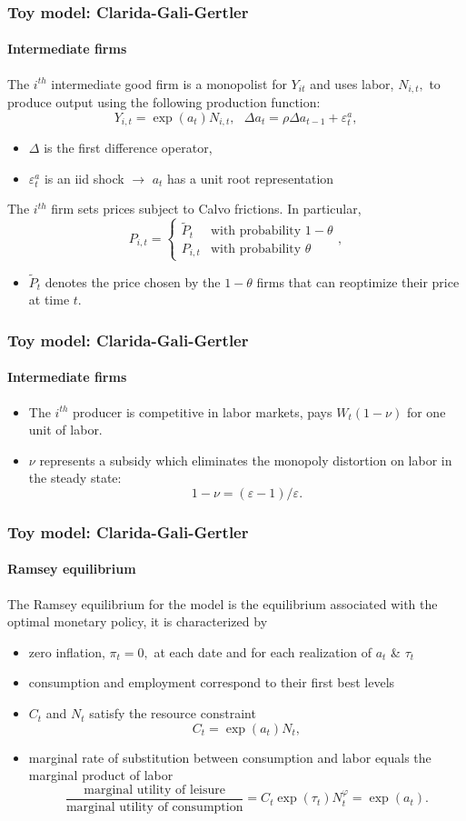 \documentclass[handout]{beamer}  %
\begin{document}
\begin{frame}    \frametitle{Toy model: Clarida-Gali-Gertler}\framesubtitle{Intermediate firms}
The $i^{th}$ intermediate good firm is a monopolist for $Y_{it}$ and uses labor, $N_{i,t},$
to produce output using the following production function:%
\[
Y_{i,t}=\exp \left( a_{t}\right) N_{i,t},\text{ }\Delta a_{t}=\rho \Delta
a_{t-1}+\varepsilon _{t}^{a},
\]%
\begin{itemize}
  \item $\Delta $ is the first difference operator,
  \item $\varepsilon _{t}^{a}$ is an iid shock $\rightarrow$ $a_{t}$ has a unit root representation
\end{itemize}
The $i^{th}$ firm sets prices subject to Calvo frictions. In particular,%
\[
P_{i,t}=\left\{
\begin{array}{cc}
\tilde{P}_{t} & \text{with probability }1-\theta \\
P_{i,t} & \text{with probability }\theta%
\end{array}%
\right. ,
\]%
\begin{itemize}
  \item $\tilde{P}_{t}$ denotes the price chosen by the $1-\theta $ firms that can reoptimize their price at time $t.$
\end{itemize}
\end{frame}

\begin{frame}
\frametitle{Toy model: Clarida-Gali-Gertler}\framesubtitle{Intermediate firms}
\begin{itemize}
  \item The $i^{th}$ producer is competitive in labor markets, pays $W_{t}\left( 1-\nu \right)$ for one unit of labor.
  \item $\nu $ represents a subsidy which eliminates the monopoly distortion on labor in the steady state:
  $$1-\nu=\left( \varepsilon -1\right) /\varepsilon .$$
\end{itemize}
\end{frame}

\begin{frame}\frametitle{Toy model: Clarida-Gali-Gertler}\framesubtitle{Ramsey equilibrium}
The Ramsey equilibrium for the model is the equilibrium associated with the
optimal monetary policy, it is characterized by
\begin{itemize}
  \item zero inflation, $\pi _{t}=0,$ at each date and for each realization of $a_{t}$ \& $\tau _{t}$
  \item consumption and employment correspond to their first best levels
  \item $C_{t}$ and $N_{t}$ satisfy the resource constraint
\[
C_{t}=\exp \left( a_{t}\right) N_{t},
\]
\item marginal rate of substitution between consumption
and labor equals the marginal product of labor%
\[
\frac{\text{marginal utility of leisure}}{\text{marginal utility of
consumption}}=C_{t}\exp \left( \tau _{t}\right) N_{t}^{\varphi }=\exp \left(
a_{t}\right) .
\]%
\end{itemize}
\end{frame}
\end{document}
